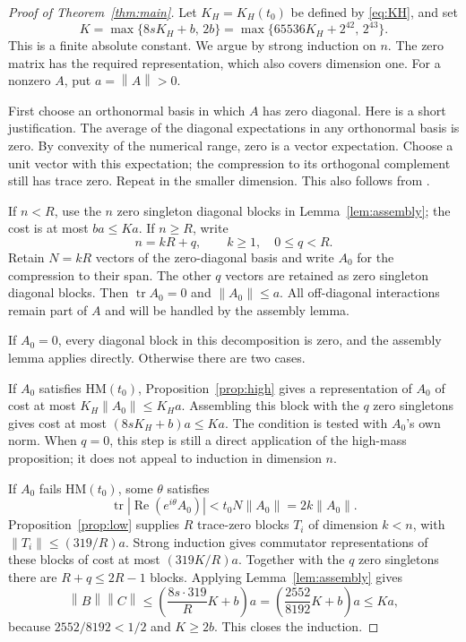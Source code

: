 \documentclass[11pt]{article}
\theoremstyle{remark}
\newcommand{\tr}{\operatorname{tr}}
\newcommand{\Rea}{\operatorname{Re}}
\newcommand{\norm}[1]{\left\lVert#1\right\rVert}
\newcommand{\HM}{\mathrm{HM}}
\numberwithin{equation}{section}
\begin{document}
\begin{proof}[Proof of Theorem~\ref{thm:main}]
Let $K_H=K_H(t_0)$ be defined by \eqref{eq:KH}, and set
\begin{equation}\label{eq:K}
 K=\max\{8sK_H+b,\,2b\}
  =\max\{65536K_H+2^{42},\,2^{43}\}.
\end{equation}
This is a finite absolute constant. We argue by strong induction on $n$.
The zero matrix has the required representation, which also covers dimension
one. For a nonzero $A$, put $a=\norm A>0$.

First choose an orthonormal basis in which $A$ has zero diagonal. Here is a
short justification. The average of the diagonal expectations in any
orthonormal basis is zero. By convexity of the numerical range, zero is a
vector expectation. Choose a unit vector with this expectation; the
compression to its orthogonal complement still has trace zero. Repeat in the
smaller dimension. This also follows from \cite[Corollary 14]{DF}.

If $n<R$, use the $n$ zero singleton diagonal blocks in
Lemma~\ref{lem:assembly}; the cost is at most $ba\le Ka$.
If $n\ge R$, write
\[
 n=kR+q,\qquad k\ge1,\quad0\le q<R.
\]
Retain $N=kR$ vectors of the zero-diagonal basis and write $A_0$ for the
compression to their span. The other $q$ vectors are retained as zero
singleton diagonal blocks. Then $\tr A_0=0$ and $\norm{A_0}\le a$. All
off-diagonal interactions remain part of $A$ and will be handled by the
assembly lemma.

If $A_0=0$, every diagonal block in this decomposition is zero, and the
assembly lemma applies directly. Otherwise there are two cases.

If $A_0$ satisfies $\HM(t_0)$, Proposition~\ref{prop:high} gives a
representation of $A_0$ of cost at most $K_H\norm{A_0}\le K_Ha$. Assembling
this block with the $q$ zero singletons gives cost at most
$(8sK_H+b)a\le Ka$. The condition is tested with $A_0$'s own norm. When
$q=0$, this step is still a direct application of the high-mass proposition;
it does not appeal to induction in dimension $n$.

If $A_0$ fails $\HM(t_0)$, some $\theta$ satisfies
\[
 \tr|\Rea(e^{i\theta}A_0)|
 <t_0N\norm{A_0}=2k\norm{A_0}.
\]
Proposition~\ref{prop:low} supplies $R$ trace-zero blocks $T_i$ of dimension
$k<n$, with $\norm{T_i}\le(319/R)a$. Strong induction gives commutator
representations of these blocks of cost at most $(319K/R)a$. Together with
the $q$ zero singletons there are $R+q\le2R-1$ blocks. Applying
Lemma~\ref{lem:assembly} gives
\[
 \norm B\norm C
 \le\left(\frac{8s\cdot319}{R}K+b\right)a
 =\left(\frac{2552}{8192}K+b\right)a
 \le Ka,
\]
because $2552/8192<1/2$ and $K\ge2b$. This closes the induction.
\end{proof}
\end{document}
